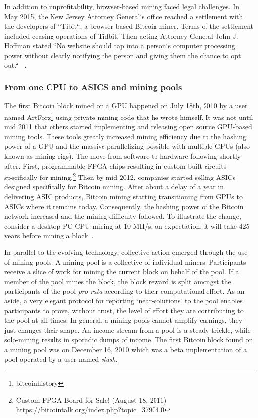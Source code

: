 In addition to unprofitability, browser-based mining faced legal challenges. In May 2015, the New Jersey Attorney General`s office reached a settlement with the developers of ``Tibit``, a browser-based Bitcoin miner. Terms of the settlement included ceasing operations of Tidbit. Then acting Attorney General John J. Hoffman stated ``No website should tap into a person`s computer processing power without clearly notifying the person and giving them the chance to opt out.`` ~\cite{njcourtbitcoinjsminer}.

\subsubsection{From one CPU to ASICS and mining pools}

The first Bitcoin block mined on a GPU happened on July 18th, 2010 by a user named ArtForz\footnote{bitcoinhistory} using private mining code that he wrote himself. It was not until mid 2011 that others started implementing and releasing open source GPU-based mining tools. These tools greatly increased mining efficiency due to the hashing power of a GPU and the massive parallelizing possible with multiple GPUs (also known as mining rigs). The move from software to hardware following shortly after. First, programmable FPGA chips resulting in custom-built circuits specifically for mining.\footnote{Custom FPGA Board for Sale! (August 18, 2011) \url{https://bitcointalk.org/index.php?topic=37904.0}} Then by mid 2012, companies started selling ASICs designed specifically for Bitcoin mining. After about a delay of a year in delivering ASIC products, Bitcoin mining starting transitioning from GPUs to ASICs where it remains today. Consequently, the hashing power of the Bitcoin network increased and the mining difficulty followed. To illustrate the change, consider a desktop PC CPU mining at 10 MH/s: on expectation, it will take 425 years before mining a block~\cite{huang2014botcoin}. 

In parallel to the evolving technology, collective action emerged through the use of mining pools. A mining pool is a collective of individual miners. Participants receive a slice of work for mining the current block on behalf of the pool. If a member of the pool mines the block, the block reward is split amongst the participants of the pool \textit{pro rata} according to their computational effort. As an aside, a very elegant protocol for reporting `near-solutions' to the pool enables participants to prove, without trust, the level of effort they are contributing to the pool at all times. In general, a mining pools cannot amplify earnings, they just changes their shape. An income stream from a pool is a steady trickle, while solo-mining results in sporadic dumps of income. The first Bitcoin block found on a mining pool was on December 16, 2010 which was a beta implementation of a pool operated by a user named \textit{slush}.

